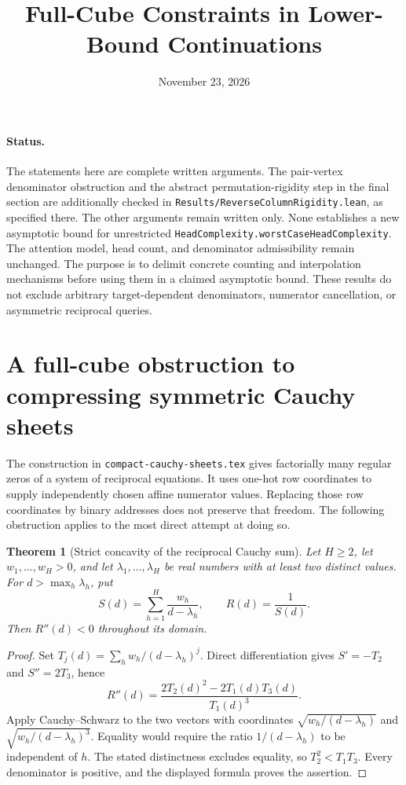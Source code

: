 \documentclass[11pt]{article}
\title{Full-Cube Constraints in Lower-Bound Continuations}
\author{}
\date{November 23, 2026}
\newtheorem{theorem}{Theorem}
\begin{document}
\maketitle

\paragraph{Status.}
The statements here are complete written arguments. The pair-vertex
denominator obstruction and the abstract permutation-rigidity step in the
final section are additionally checked in
\texttt{Results/ReverseColumnRigidity.lean}, as specified there. The other
arguments remain written only. None establishes a new asymptotic bound
for unrestricted \texttt{HeadComplexity.worstCaseHeadComplexity}. The attention model,
head count, and denominator admissibility remain unchanged. The purpose
is to delimit concrete counting and interpolation mechanisms before using
them in a claimed asymptotic bound. These results do not exclude arbitrary target-dependent
denominators, numerator cancellation, or asymmetric reciprocal queries.

\section{A full-cube obstruction to compressing symmetric Cauchy sheets}

The construction in \texttt{compact-cauchy-sheets.tex} gives factorially
many regular zeros of a system of reciprocal equations. It uses one-hot
row coordinates to supply independently chosen affine numerator values.
Replacing those row coordinates by binary addresses does not preserve
that freedom. The following obstruction applies to the most direct
attempt at doing so.

\begin{theorem}[Strict concavity of the reciprocal Cauchy sum]
Let $H\geq 2$, let $w_1,\ldots,w_H>0$, and let
$\lambda_1,\ldots,\lambda_H$ be real numbers with at least two distinct
values. For $d>\max_h\lambda_h$, put
\[
 S(d)=\sum_{h=1}^H\frac{w_h}{d-\lambda_h},\qquad R(d)=\frac1{S(d)}.
\]
Then $R''(d)<0$ throughout its domain.
\end{theorem}

\begin{proof}
Set $T_j(d)=\sum_h w_h/(d-\lambda_h)^j$. Direct differentiation gives
$S'=-T_2$ and $S''=2T_3$, hence
\[
 R''(d)=\frac{2T_2(d)^2-2T_1(d)T_3(d)}{T_1(d)^3}.
\]
Apply Cauchy--Schwarz to the two vectors with coordinates
$\sqrt{w_h/(d-\lambda_h)}$ and
$\sqrt{w_h/(d-\lambda_h)^3}$. Equality would require the ratio
$1/(d-\lambda_h)$ to be independent of $h$. The stated distinctness
excludes equality, so $T_2^2<T_1T_3$. Every denominator is positive,
and the displayed formula proves the assertion.
\end{proof}
\end{document}

